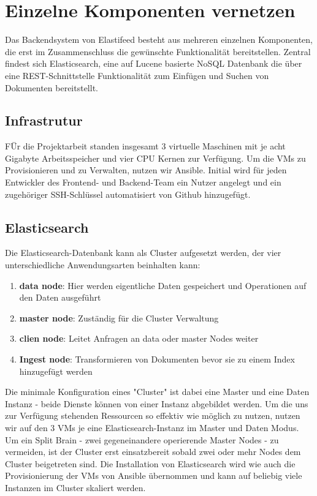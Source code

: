 \section{Einzelne Komponenten vernetzen}

Das Backendsystem von Elastifeed besteht aus mehreren einzelnen Komponenten, die erst im Zusammenschluss die gewünschte Funktionalität bereitstellen.
Zentral findest sich Elasticsearch, eine auf Lucene basierte NoSQL Datenbank die über eine REST-Schnittstelle Funktionalität zum Einfügen und Suchen von Dokumenten bereitstellt.


\subsection{Infrastrutur}
FÜr die Projektarbeit standen insgesamt 3 virtuelle Maschinen mit je acht Gigabyte Arbeitsspeicher und vier CPU Kernen zur Verfügung.
Um die VMs zu Provisionieren und zu Verwalten, nutzen wir Ansible.
Initial wird für jeden Entwickler des Frontend- und Backend-Team ein Nutzer angelegt und ein zugehöriger SSH-Schlüssel automatisiert von Github hinzugefügt.

\subsection{Elasticsearch}
Die Elasticsearch-Datenbank kann als Cluster aufgesetzt werden, der vier unterschiedliche Anwendungsarten beinhalten kann:
\begin{enumerate}
        \item \textbf{data node}: Hier werden eigentliche Daten gespeichert und Operationen auf den Daten ausgeführt
        \item \textbf{master node}: Zuständig für die Cluster Verwaltung
        \item \textbf{clien node}: Leitet Anfragen an data oder master Nodes weiter
        \item \textbf{Ingest node}: Transformieren von Dokumenten bevor sie zu einem Index hinzugefügt werden
\end{enumerate}
Die minimale Konfiguration eines "Cluster" ist dabei eine Master und eine Daten Instanz - beide Dienste können von einer Instanz abgebildet werden.
Um die uns zur Verfügung stehenden Ressourcen so effektiv wie möglich zu nutzen, nutzen wir auf den 3 VMs je eine Elasticsearch-Instanz im Master und Daten Modus.
Um ein Split Brain - zwei gegeneinandere operierende Master Nodes - zu vermeiden, ist der Cluster erst einsatzbereit sobald zwei oder mehr Nodes dem Cluster beigetreten sind.
Die Installation von Elasticsearch wird wie auch die Provisionierung der VMs von Ansible übernommen und kann auf beliebig viele Instanzen im Cluster skaliert werden.

